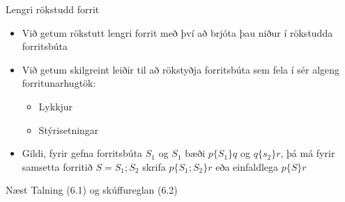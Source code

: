 \documentclass[handout]{beamer}
\begin{document}
\begin{frame}{Lengri rökstudd forrit}
\begin{itemize}
 \item Við getum rökstutt lengri forrit með því að brjóta þau niður í rökstudda forritsbúta
 \item Við getum skilgreint leiðir til að rökstyðja forritsbúta sem fela í sér algeng forritunarhugtök:
 \begin{itemize}
  \item Lykkjur
  \item Stýrisetningar
 \end{itemize}
 \item Gildi, fyrir gefna forritsbúta $S_1$ og $S_1$ bæði $p\{S_1\}q$ og $q\{s_2\}r$, þá má fyrir samsetta forritið $S = S_1;S_2$ skrifa $p\{S_1; S_2\}r$ eða einfaldlega $p\{S\}r$
\end{itemize}
\end{frame}


\begin{frame}{Næst}
Talning (6.1) og skúffureglan (6.2)
\end{frame}
\end{document}
